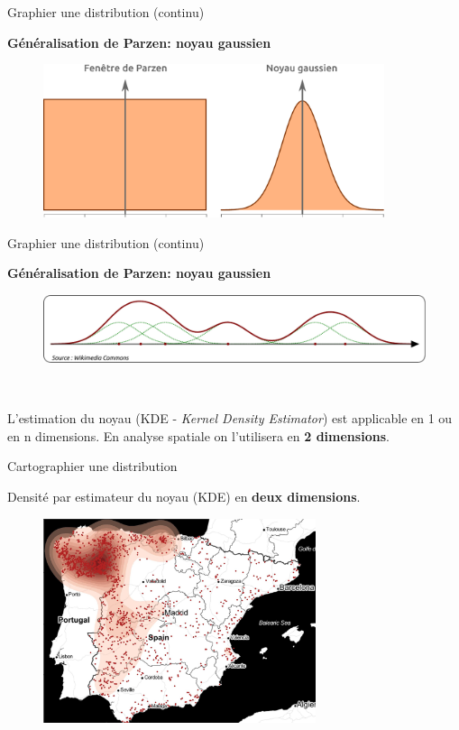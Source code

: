 \begin{frame}{Graphier une distribution (continu)}

\textbf{Généralisation de Parzen: noyau gaussien}

\begin{figure}
\includegraphics[width=10cm]{Gauss.pdf}
\end{figure}

\end{frame}


\begin{frame}{Graphier une distribution (continu)}

\textbf{Généralisation de Parzen: noyau gaussien}

\begin{figure}
\includegraphics[width=12cm]{KDE.pdf}
\end{figure}

~

L'estimation du noyau (KDE - \textit{Kernel Density Estimator}) est applicable en 1 ou en n dimensions. En analyse spatiale on l'utilisera en \textbf{2 dimensions}.

\end{frame}


\begin{frame}{Cartographier une distribution}

Densité par estimateur du noyau (KDE) en \textbf{deux dimensions}.

\begin{figure}
  \includegraphics[width=8cm]{Incendies.jpg}
\end{figure}

\end{frame}


